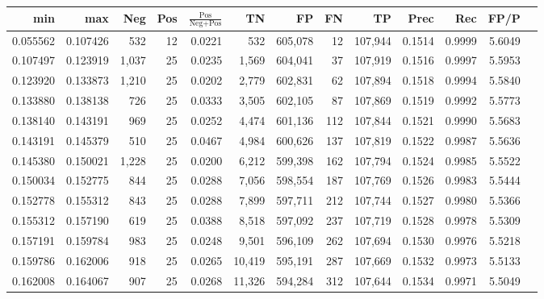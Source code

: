 \begin{tabular}{rrrrrrrrrrrrr}
\toprule
     min &      max &   Neg & Pos & $\frac{\text{Pos}}{\text{Neg}+\text{Pos}}$ &      TN &      FP &      FN &      TP &   Prec &    Rec &   FP/P \\
\midrule
0.055562 & 0.107426 &   532 &  12 &                                     0.0221 &     532 & 605,078 &      12 & 107,944 & 0.1514 & 0.9999 & 5.6049 \\
0.107497 & 0.123919 & 1,037 &  25 &                                     0.0235 &   1,569 & 604,041 &      37 & 107,919 & 0.1516 & 0.9997 & 5.5953 \\
0.123920 & 0.133873 & 1,210 &  25 &                                     0.0202 &   2,779 & 602,831 &      62 & 107,894 & 0.1518 & 0.9994 & 5.5840 \\
0.133880 & 0.138138 &   726 &  25 &                                     0.0333 &   3,505 & 602,105 &      87 & 107,869 & 0.1519 & 0.9992 & 5.5773 \\
0.138140 & 0.143191 &   969 &  25 &                                     0.0252 &   4,474 & 601,136 &     112 & 107,844 & 0.1521 & 0.9990 & 5.5683 \\
0.143191 & 0.145379 &   510 &  25 &                                     0.0467 &   4,984 & 600,626 &     137 & 107,819 & 0.1522 & 0.9987 & 5.5636 \\
0.145380 & 0.150021 & 1,228 &  25 &                                     0.0200 &   6,212 & 599,398 &     162 & 107,794 & 0.1524 & 0.9985 & 5.5522 \\
0.150034 & 0.152775 &   844 &  25 &                                     0.0288 &   7,056 & 598,554 &     187 & 107,769 & 0.1526 & 0.9983 & 5.5444 \\
0.152778 & 0.155312 &   843 &  25 &                                     0.0288 &   7,899 & 597,711 &     212 & 107,744 & 0.1527 & 0.9980 & 5.5366 \\
0.155312 & 0.157190 &   619 &  25 &                                     0.0388 &   8,518 & 597,092 &     237 & 107,719 & 0.1528 & 0.9978 & 5.5309 \\
0.157191 & 0.159784 &   983 &  25 &                                     0.0248 &   9,501 & 596,109 &     262 & 107,694 & 0.1530 & 0.9976 & 5.5218 \\
0.159786 & 0.162006 &   918 &  25 &                                     0.0265 &  10,419 & 595,191 &     287 & 107,669 & 0.1532 & 0.9973 & 5.5133 \\
0.162008 & 0.164067 &   907 &  25 &                                     0.0268 &  11,326 & 594,284 &     312 & 107,644 & 0.1534 & 0.9971 & 5.5049 \\

\end{tabular}
